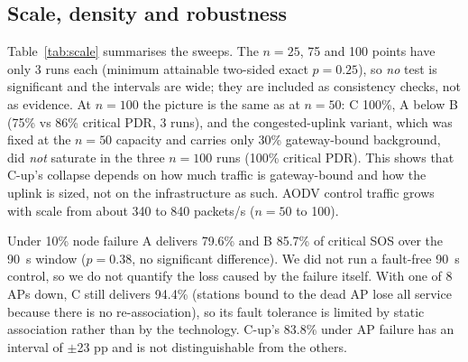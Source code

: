 \subsection{Scale, density and robustness}
Table~\ref{tab:scale} summarises the sweeps. The $n=25$, 75 and 100 points have only 3 runs each (minimum attainable two-sided exact $p=0.25$), so \emph{no} test is significant and the intervals are wide;
they are included as consistency checks, not as evidence. At $n=100$ the picture is the same as at $n=50$: C 100\%, A below B (75\% vs 86\% critical PDR, 3 runs), and the
congested-uplink variant, which was fixed at the $n=50$ capacity and carries only 30\% gateway-bound background, did \emph{not} saturate in the three $n=100$ runs (100\% critical PDR).
This shows that C-up's collapse depends on how much traffic is gateway-bound and how the uplink is sized, not on the infrastructure as such. AODV control traffic grows with scale from about 340 to 840 packets/s ($n=50$ to 100).
\begin{table}[t]\centering\caption{Scale and failure experiments at High load. Robustness runs use 90~s windows with the fault at $t=50$~s: 10\% of non-desk nodes switched off in A and B, one AP's radio off in C and C-up with no re-association (a worst-case lower bound for C).}\label{tab:scale}
\small\end{table}
Under 10\% node failure A delivers 79.6\% and B 85.7\% of critical SOS over the 90~s window ($p=0.38$, no significant difference). We did not run a fault-free 90~s control, so we do not quantify the loss caused by the failure itself.
With one of 8 APs down, C still delivers 94.4\% (stations bound to the dead AP lose all service because there is no re-association), so its fault tolerance is limited
by static association rather than by the technology. C-up's 83.8\% under AP failure has an interval of $\pm$23 pp and is not distinguishable from the others.

